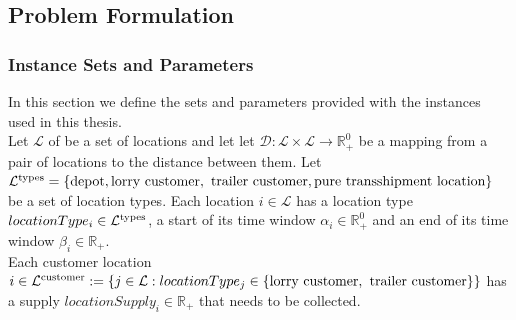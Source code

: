 \subsection{Problem Formulation}
\label{subsection:model}




\subsubsection{Instance Sets and Parameters}

In this section we define the sets and parameters provided with the instances used in this thesis.\\


Let
$\mathcal L $
of be a set of locations and let
let
$ \mathcal D : \mathcal L \times \mathcal L \rightarrow  \mathbb{R}^0_+$
be a mapping from a pair of locations to the distance between them.
Let
$\mathcal L^{\rm types} =  \{ {\rm \text{depot}}, {\rm \text{lorry customer}}, $ $ {\rm \text{trailer customer}}, {\rm \text{pure transshipment location}} \} $
be a set of location types.
Each location
$i \in \mathcal L$
has a location type
$locationType_i \in \mathcal L^{\rm types}$,
a start of its time window
$\alpha_i \in \mathbb{R}^0_+$
and an end of its time window
$\beta_i \in \mathbb{R}_+$.
\\

Each customer location
$i \in \mathcal L^{\rm customer} :=
\{ j \in \mathcal L: locationType_j \in \{ {\rm \text{lorry customer}}, $ $  {\rm  \text{trailer customer}} \} \} $
has a supply
$locationSupply_i \in \mathbb{R}_+$
that needs to be collected.
\\

